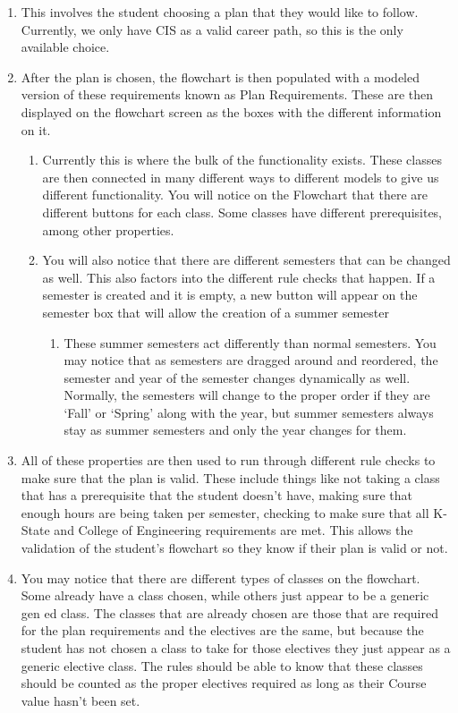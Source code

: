 \documentclass[12pt]{article}
\begin{document}
\begin{enumerate}
    \item This involves the student choosing a plan that they would like to follow. Currently, we only have CIS as a valid career path, so this is the only available choice.
    \item After the plan is chosen, the flowchart is then populated with a modeled version of these requirements known as Plan Requirements. These are then displayed on the flowchart screen as the boxes with the different information on it.
    \begin{enumerate}
        \item Currently this is where the bulk of the functionality exists. These classes are then connected in many different ways to different models to give us different functionality. You will notice on the Flowchart that there are different buttons for each class. Some classes have different prerequisites, among other properties.
        \item You will also notice that there are different semesters that can be changed as well. This also factors into the different rule checks that happen. If a semester is created and it is empty, a new button will appear on the semester box that will allow the creation of a summer semester
        \begin{enumerate}
            \item These summer semesters act differently than normal semesters. You may notice that as semesters are dragged around and reordered, the semester and year of the semester changes dynamically as well. Normally, the semesters will change to the proper order if they are ‘Fall’ or ‘Spring’ along with the year, but summer semesters always stay as summer semesters and only the year changes for them.
        \end{enumerate}
    \end{enumerate}
    \item All of these properties are then used to run through different rule checks to make sure that the plan is valid. These include things like not taking a class that has a prerequisite that the student doesn't have, making sure that enough hours are being taken per semester, checking to make sure that all K-State and College of Engineering requirements are met. This allows the validation of the student’s flowchart so they know if their plan is valid or not.
    \item You may notice that there are different types of classes on the flowchart. Some already have a class chosen, while others just appear to be a generic gen ed class. The classes that are already chosen are those that are required for the plan requirements and the electives are the same, but because the student has not chosen a class to take for those electives they just appear as a generic elective class. The rules should be able to know that these classes should be counted as the proper electives required as long as their Course value hasn't been set.

\end{enumerate}
\end{document}
